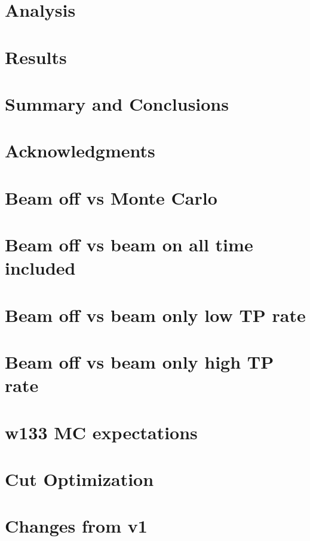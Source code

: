 \documentclass[a4paper,11pt]{article}
\begin{document}
\section{Analysis}


\clearpage
\section{Results}


\section{Summary and Conclusions}

\section{Acknowledgments}





\clearpage

\appendix
\section{Beam off vs Monte Carlo}

\clearpage
\section{Beam off vs beam on all time included}

\clearpage
\section{Beam off vs beam only low TP rate}

\clearpage
\section{Beam off vs beam only high TP rate}

\clearpage
\section{w133 MC expectations}

\clearpage
\section{Cut Optimization}

\clearpage
\section{Changes from v1}

\clearpage
\end{document}
